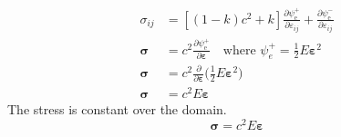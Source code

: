 \documentclass[12pt,3p]{article}
\numberwithin{equation}{section}
\begin{document}
\begin{align*}
\sigma_{i j} &= \left[(1-k) c^{2}+k\right] \frac{\partial \psi_{\mathrm{e}}^{+}}{\partial \varepsilon_{i j}} + \frac{\partial \psi_{\mathrm{e}}^{-}}{\partial \varepsilon_{i j}} \\
\boldsymbol{\sigma} &= c^2 \frac{\partial \psi_{\mathrm{e}}^{+}}{\partial \boldsymbol{\varepsilon}} \quad \text{where }  \psi_{e}^{+} = \frac{1}{2} E \boldsymbol{\varepsilon}^2 \\
\boldsymbol{\sigma} &= c^2 \frac{\partial}{\partial \boldsymbol{\varepsilon}} \bigg( \frac{1}{2} E \boldsymbol{\varepsilon}^2 \bigg) \\
\boldsymbol{\sigma} &= c^2 E \boldsymbol{\varepsilon}
\end{align*}
The stress is constant over the domain. 
\begin{equation}\label{HomogStress}
\boldsymbol{\sigma} = c^2 E \boldsymbol{\varepsilon}
\end{equation}

\end{document}
